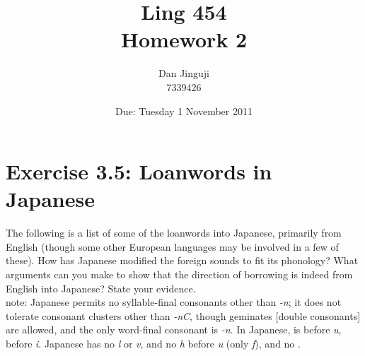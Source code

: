 \documentclass[12pt]{article}
\begin{document}
\title{Ling 454 \\ Homework 2}
\author{Dan Jinguji \\ 7339426}
\date{Due: Tuesday 1 November 2011}

\maketitle

\renewcommand\thesection {\arabic{section}:}
\renewcommand\thesubsection {(\arabic{subsection})}
\newcommand{\and}{\,\&\;}
\newcommand{\llb}{\ensuremath{\llbracket}}
\newcommand{\rrb}{\ensuremath{\rrbracket}}
\newcommand{\blt}{\ensuremath{\bullet\;}}
\newcommand{\sem}[1]{\ensuremath{\llbracket\mathrm{#1}\rrbracket}}
\newcommand{\und}{\ensuremath{\_\,}}
\newcommand{\then}{\ensuremath{\rightarrow}}
\newcommand{\dom}[1]{\ensuremath{\mathbf{D}_{\mathrm{#1}}}}
\newcommand{\lamb}[3]{{[\ensuremath{\lambda\mathrm{#1}\;\in\;{#2}\;.\;}{#3}]}}
\newcommand{\ip}[1]{\textipa{#1}}
\newcommand{\rd}{\textrtaild}

\section{Exercise 3.5: Loanwords in Japanese}

The following is a list of some of the loanwords into Japanese, primarily from English (though some other European languages may be involved in a few of these). How has Japanese modified the foreign sounds to fit its phonology? What arguments can you make to show that the direction of borrowing is indeed from English into Japanese? State your evidence. \\
{\sc note}: Japanese permits no syllable-final consonants other than {\it -n}; it does not tolerate consonant clusters other than {\it -nC}, though geminates [double consonants] are allowed, and the only word-final consonant is {\it -n}. In Japanese, \ip{/t/} is \ip{[ts]} before {\it u}, \ip{[tS]} before {\it i}. Japanese has no {\it l} or {\it v}, and no {\it h} before {\it u} (only {\it f}), and no \ip{@}. \\
\end{document}
